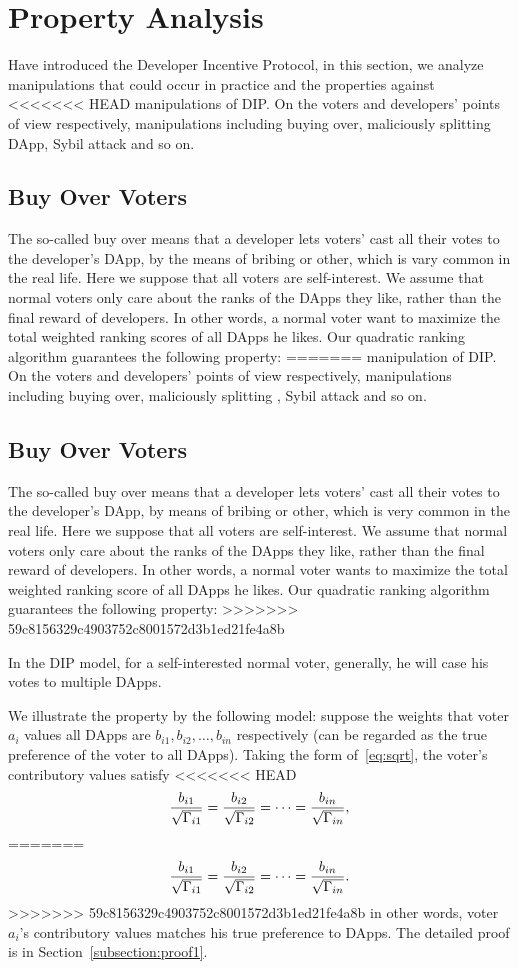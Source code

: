 \section{Property Analysis}
\label{section:properties}
Have introduced the Developer Incentive Protocol, in this section, we analyze
manipulations that could occur in practice and the properties against
<<<<<<< HEAD
manipulations of  DIP\@. On the voters and developers' points of view respectively, manipulations including buying over, maliciously splitting DApp, Sybil attack and so on.
\subsection{Buy Over Voters}
The so-called buy over means that a developer lets voters' cast all their votes to the developer's DApp, by the means of bribing or other, which is vary common in the real life. Here we suppose that all voters are self-interest. We assume that normal voters only care about the ranks of the DApps they like, rather than the final reward of developers. In other words, a normal voter want to maximize the total
weighted ranking scores of all DApps he likes. Our quadratic ranking algorithm guarantees the following property:
=======
manipulation of  DIP\@. On the voters and developers' points of view respectively, manipulations including buying over, maliciously splitting \dapp, Sybil attack and so on.
\subsection{Buy Over Voters}
The so-called buy over means that a developer lets voters' cast all their votes to the developer's DApp, by  means of bribing or other, which is very common in the real life. Here we suppose that all voters are self-interest. We assume that normal voters only care about the ranks of the DApps they like, rather than the final reward of developers. In other words, a normal voter wants to maximize the total
weighted ranking score of all DApps he likes. Our quadratic ranking algorithm guarantees the following property:
>>>>>>> 59c8156329c4903752c8001572d3b1ed21fe4a8b
\begin{property}
	\label{p1}
	In the DIP model, for a self-interested normal voter, generally, he will case his votes to multiple DApps.
\end{property}
We illustrate the property by the following model: suppose the weights that
voter $a_i$ values all DApps are $b_{i1}, b_{i2}, \ldots, b_{in}$ respectively (can be regarded as the true preference of the voter to all DApps). Taking the form of~\ref{eq:sqrt}, the voter's contributory values satisfy
<<<<<<< HEAD
$$\frac{b_{i1}}{\sqrt{\Gamma_{i1}}}=\frac{b_{i2}}{\sqrt{\Gamma_{i2}}}=\cdots=\frac{b_{in}}{\sqrt{\Gamma_{in}}},$$
=======
$$\frac{b_{i1}}{\sqrt{\Gamma_{i1}}}=\frac{b_{i2}}{\sqrt{\Gamma_{i2}}}=\cdots=\frac{b_{in}}{\sqrt{\Gamma_{in}}}.$$
>>>>>>> 59c8156329c4903752c8001572d3b1ed21fe4a8b
in other words, voter $a_i$'s contributory values matches his true preference to DApps. The detailed proof is in Section~\ref{subsection:proof1}.

